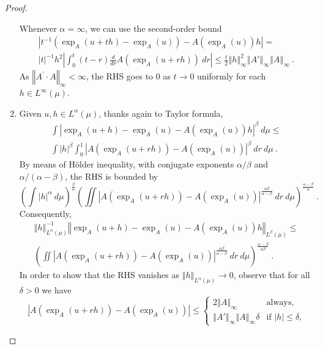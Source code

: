 \documentclass[graybox]{svmult}
\newcommand{\normat}[2]{\left\Vert#2\right\Vert_{#1}}
\begin{document}
\begin{proof}
\begin{enumerate}
Whenever $\alpha =\infty $, we can use the second-order bound 
\begin{multline*}
\left\vert t^{-1}\left( \exp _{A}(u+th)-\exp _{A}(u)\right) -A(\exp
_{A}(u))h\right\vert = \\
\vert t \vert^{-1}h^{2}\left\vert \int_{0}^{t}(t-r)\frac{d}{dr}A(\exp _{A}(u+rh))\
dr\right\vert \leq \frac{t}{2}\left\Vert h\right\Vert _{\infty
}^{2} \normat \infty {A'} \normat \infty A \ .
\end{multline*}
As $\left\Vert A^{\prime }\cdot A\right\Vert _{\infty }<\infty $, the
RHS goes to 0 as $t\rightarrow 0$ uniformly for each $h\in L^{\infty }(\mu )$.
%
\item Given $u,h\in L^{\alpha }(\mu )$, thanks again to Taylor
formula,  
\begin{multline*}
\int \left\vert \exp _{A}(u+h)-\exp _{A}(u)-A(\exp _{A}(u))h\right\vert
^{\beta }\ d\mu \leq \\
\int \left\vert h\right\vert ^{\beta }\int_{0}^{1}\left\vert A(\exp
_{A}(u+rh))-A(\exp _{A}(u))\right\vert ^{\beta }\ dr\ d\mu \ .
\end{multline*}
By means of H\"{o}lder inequality, with conjugate exponents $\alpha /\beta $ and 
$\alpha /(\alpha -\beta )$, the RHS is bounded by 
\begin{equation*}
\left( \int \left\vert h\right\vert ^{\alpha }\ d\mu \right) ^{\frac{\beta }{\alpha }}
\left( \iint \left\vert A(\exp _{A}(u+rh))-A(\exp _{A}(u))\right\vert ^{\frac{\alpha \beta }{\alpha -\beta }}\ dr\ d\mu\right) ^{\frac{\alpha -\beta 
}{\alpha }}\ .
\end{equation*}
Consequently, 
\begin{multline*}
\left\Vert h\right\Vert _{L^{\alpha }(\mu )}^{-1}\left\Vert \exp
_{A}(u+h)-\exp _{A}(u)-A(\exp _{A}(u))h\right\Vert _{L^{\beta }(\mu )}\leq \\
\left( \iint \left\vert A(\exp _{A}(u+rh))-A(\exp _{A}(u))\right\vert ^{\frac{\alpha \beta }{\alpha -\beta }}\ dr\ d\mu\right) ^{\frac{\alpha -\beta 
}{\alpha \beta }}\ .
\end{multline*}
In order to show that the RHS vanishes as $\left\Vert h\right\Vert
_{L^{\alpha }(\mu )}\rightarrow 0$, observe that for all $\delta >0$ we have 
\begin{equation*}
\left\vert A(\exp _{A}(u+rh))-A(\exp _{A}(u))\right\vert \leq 
\begin{cases}
2\left\Vert A\right\Vert _{\infty } & \text{always,} \\ 
\normat \infty {A'} \normat \infty A \delta & \text{if $\left\vert h\right\vert \leq \delta $,}

\end{cases}
\end{equation*}
\end{enumerate}
\end{proof}
\end{document}
